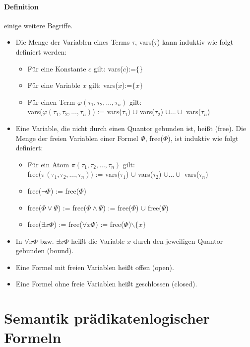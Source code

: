 \documentclass[a4paper]{scrartcl}
\begin{document}
\paragraph{Definition} einige weitere Begriffe.
\begin{itemize}
\item Die Menge der Variablen eines Terms $\tau$, vars($\tau$) kann induktiv wie folgt definiert werden:
 \begin{itemize}
 \item Für eine Konstante $c$ gilt: vars($c$):=$\{\}$
 \item Für eine Variable $x$ gilt: vars($x$):=$\{x\}$
 \item Für einen Term $\varphi(\tau_1, \tau_2, \ldots, \tau_n)$ gilt: \\vars($\varphi(\tau_1, \tau_2, \ldots, \tau_n)$) := vars($\tau_1$) $\cup$ vars($\tau_2$) $\cup \ldots \cup$ vars($\tau_n$)
 \end{itemize}
\item Eine Variable, die nicht durch einen Quantor gebunden ist, heißt  (free). Die Menge der freien Variablen einer Formel $\Phi$, free($\Phi$), ist induktiv wie folgt definiert:
 \begin{itemize}
 \item Für ein Atom $\pi(\tau_1,\tau_2,\ldots,\tau_n)$ gilt: \\
free($\pi(\tau_1,\tau_2,\ldots,\tau_n)$) := vars($\tau_1$) $\cup$ vars($\tau_2$) $\cup \ldots \cup$ vars($\tau_n$)
 \item free($\neg\Phi$) := free($\Phi$)
 \item free($\Phi\vee\Psi$) := free($\Phi\wedge\Psi$) := free($\Phi$) $\cup$ free($\Psi$)
 \item free($\exists x\Phi$) := free($\forall x\Phi$) := free($\Phi$)$\backslash \{x\}$
 \end{itemize}
\item In $\forall x \Phi$ bzw. $\exists x\Phi$ heißt die Variable $x$ durch den jeweiligen Quantor gebunden (bound).
\item Eine Formel mit freien Variablen heißt offen (open).
\item Eine Formel ohne freie Variablen heißt geschlossen (closed).
\end{itemize}


\section{Semantik prädikatenlogischer Formeln }
\end{document}
